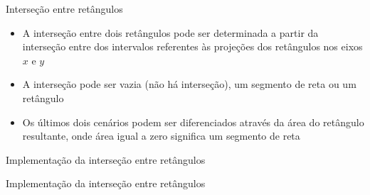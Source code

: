 \begin{frame}[fragile]{Interseção entre retângulos}

    \begin{itemize}
        \item A interseção entre dois retângulos pode ser determinada a partir da 
            interseção entre dos intervalos referentes às projeções dos retângulos nos eixos 
            $x$ e $y$

        \item A interseção pode ser vazia (não há interseção), um segmento de reta ou um retângulo

        \item Os últimos dois cenários podem ser diferenciados através da área do retângulo 
            resultante, onde área igual a zero significa um segmento de reta

    \end{itemize}

    \begin{figure}
        \centering

    \end{figure}
\end{frame}

\begin{frame}[fragile]{Implementação da interseção entre retângulos}
\end{frame}

\begin{frame}[fragile]{Implementação da interseção entre retângulos}
\end{frame}
